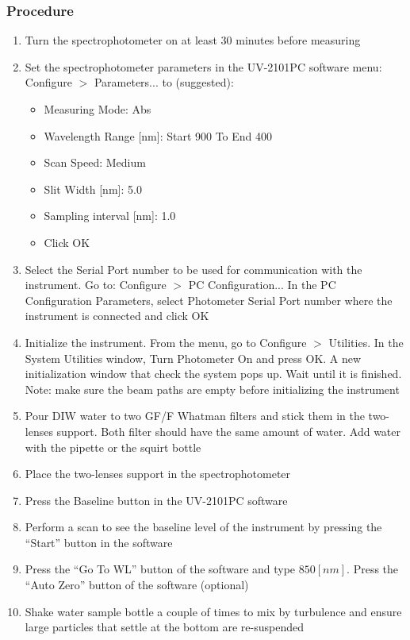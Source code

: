 \begin{appendices}
\subsubsection{Procedure}
\begin{enumerate}[itemsep=2pt,parsep=2pt]
  \item Turn the spectrophotometer on at least 30 minutes before measuring
  \item Set the spectrophotometer parameters in the UV-2101PC software menu: Configure $>$ Parameters... to (suggested):
  \begin{itemize}[itemsep=2pt,parsep=2pt]
    \item Measuring Mode: Abs
    \item Wavelength Range [nm]: Start 900 To End 400
    \item Scan Speed: Medium
    \item Slit Width [nm]: 5.0
    \item Sampling interval [nm]: 1.0
    \item Click OK
  \end{itemize}
  \item Select the Serial Port number to be used for communication with the instrument. Go to: Configure $>$ PC Configuration... In the PC Configuration Parameters, select Photometer Serial Port number where the instrument is connected and click OK
  \item Initialize the instrument. From the menu, go to Configure $>$ Utilities. In the System Utilities window, Turn Photometer On and press OK. A new initialization window that check the system pops up. Wait until it is finished. Note: make sure the beam paths are empty before initializing the instrument
  \item Pour DIW water to two GF/F Whatman filters and stick them in the two-lenses support. Both filter should have the same amount of water. Add water with the pipette or the squirt bottle
  \item Place the two-lenses support in the spectrophotometer
  \item Press the Baseline button in the UV-2101PC software
  \item Perform a scan to see the baseline level of the instrument by pressing the ``Start'' button in the software
  \item Press the ``Go To WL'' button of the software and type $850 [nm]$. Press the ``Auto Zero'' button of the software (optional)
  \item Shake water sample bottle a couple of times to mix by turbulence and ensure large particles that settle at the bottom are re-suspended \citep{Mitchell2002}

\end{enumerate}
\end{appendices}
